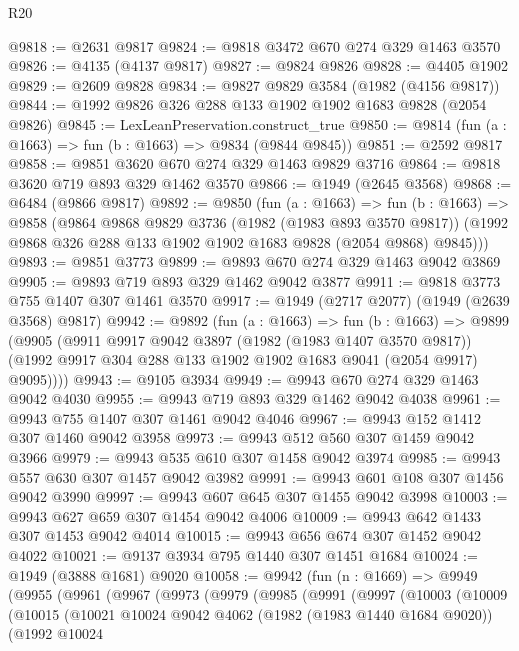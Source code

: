 \begin{lexlean}{R20}
\begin{coremodule}
@9818 := @2631 @9817
@9824 := @9818 @3472 @670 @274 @329 @1463 @3570
@9826 := @4135 (@4137 @9817)
@9827 := @9824 @9826
@9828 := @4405 @1902
@9829 := @2609 @9828
@9834 := @9827 @9829 @3584 (@1982 (@4156 @9817))
@9844 := @1992 @9826 @326 @288 @133 @1902 @1902 @1683 @9828 (@2054 @9826)
@9845 := LexLeanPreservation.construct_true
@9850 := @9814 (fun (a : @1663) => fun (b : @1663) => @9834 (@9844 @9845))
@9851 := @2592 @9817
@9858 := @9851 @3620 @670 @274 @329 @1463 @9829 @3716
@9864 := @9818 @3620 @719 @893 @329 @1462 @3570
@9866 := @1949 (@2645 @3568)
@9868 := @6484 (@9866 @9817)
@9892 := @9850
    (fun (a : @1663) =>
    fun (b : @1663) =>
    @9858
      (@9864
        @9868
        @9829
        @3736
        (@1982 (@1983 @893 @3570 @9817))
        (@1992 @9868 @326 @288 @133 @1902 @1902 @1683 @9828 (@2054 @9868) @9845)))
@9893 := @9851 @3773
@9899 := @9893 @670 @274 @329 @1463 @9042 @3869
@9905 := @9893 @719 @893 @329 @1462 @9042 @3877
@9911 := @9818 @3773 @755 @1407 @307 @1461 @3570
@9917 := @1949 (@2717 @2077) (@1949 (@2639 @3568) @9817)
@9942 := @9892
    (fun (a : @1663) =>
    fun (b : @1663) =>
    @9899
      (@9905
        (@9911
          @9917
          @9042
          @3897
          (@1982 (@1983 @1407 @3570 @9817))
          (@1992 @9917 @304 @288 @133 @1902 @1902 @1683 @9041 (@2054 @9917) @9095))))
@9943 := @9105 @3934
@9949 := @9943 @670 @274 @329 @1463 @9042 @4030
@9955 := @9943 @719 @893 @329 @1462 @9042 @4038
@9961 := @9943 @755 @1407 @307 @1461 @9042 @4046
@9967 := @9943 @152 @1412 @307 @1460 @9042 @3958
@9973 := @9943 @512 @560 @307 @1459 @9042 @3966
@9979 := @9943 @535 @610 @307 @1458 @9042 @3974
@9985 := @9943 @557 @630 @307 @1457 @9042 @3982
@9991 := @9943 @601 @108 @307 @1456 @9042 @3990
@9997 := @9943 @607 @645 @307 @1455 @9042 @3998
@10003 := @9943 @627 @659 @307 @1454 @9042 @4006
@10009 := @9943 @642 @1433 @307 @1453 @9042 @4014
@10015 := @9943 @656 @674 @307 @1452 @9042 @4022
@10021 := @9137 @3934 @795 @1440 @307 @1451 @1684
@10024 := @1949 (@3888 @1681) @9020
@10058 := @9942
    (fun (n : @1669) =>
    @9949
      (@9955
        (@9961
          (@9967
            (@9973
              (@9979
                (@9985
                  (@9991
                    (@9997
                      (@10003
                        (@10009
                          (@10015
                            (@10021
                              @10024
                              @9042
                              @4062
                              (@1982 (@1983 @1440 @1684 @9020))
                              (@1992
                                @10024

\end{coremodule}
\end{lexlean}
